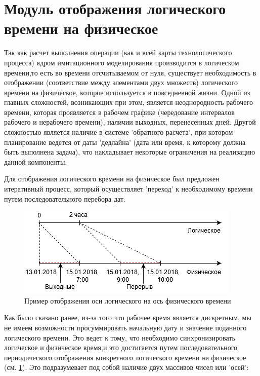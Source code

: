 \section{Модуль отображения логического времени на физическое}
\indent Так как расчет выполнения операции (как и всей карты технологического процесса) ядром имитационного моделирования производится в логическом времени,то есть во времени отсчитываемом от нуля, существует необходимость в отображении (соответствие между элементами двух множеств) логического времени на физическое, которое используется в повседневной жизни.
Одной из главных сложностей, возникающих при этом, является неоднородность рабочего времени, которая проявляется в рабочем графике (чередование интервалов рабочего и нерабочего времени), наличии выходных, перенесенных дней.
Другой сложностью является наличие в системе 'обратного расчета', при котором планирование ведется от даты 'дедлайна' (дата или время, к которому должна быть выполнена задача), что накладывает некоторые ограничения на реализацию данной компоненты.

\indent Для отображения логического времени на физическое был предложен итеративный процесс, который осуществляет 'переход' к необходимому времени путем последовательного перебора дат.

\begin{figure}[h]
	\includegraphics[width=\linewidth]{pics/scheduleAxes.png}
	\caption{Пример отображения оси логического на ось физического времени}
	\label{fig:axes}
	\centering
\end{figure}

\indent Как было сказано ранее, из-за того что рабочее время является дискретным, мы не имеем возможности просуммировать начальную дату и значение поданного логического времени.
Это ведет к тому, что необходимо синхронизировать логическое и физическое время,и это достигается путем последовательного периодического отображения конкретного логического времени на физическое (см. \ref{fig:axes}).
Это подразумевает под собой наличие двух массивов чисел или 'осей':

